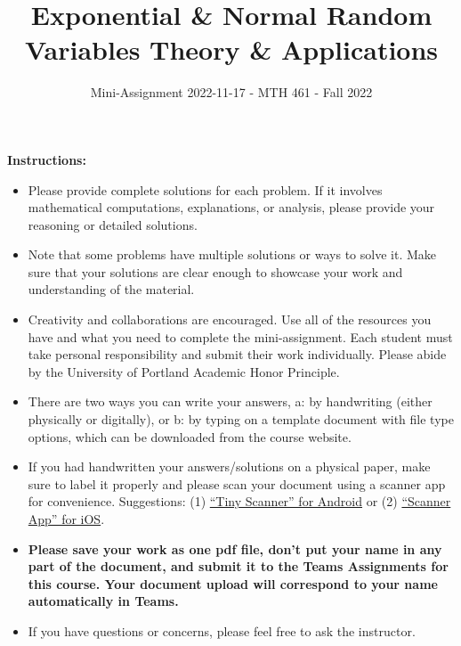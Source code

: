 \documentclass[
]{article}
\title{\textbf{Exponential \& Normal Random Variables Theory \& Applications}}
\subtitle{Mini-Assignment 2022-11-17 - MTH 461 - Fall 2022}
\author{}
\date{\vspace{-2.5em}}
\begin{document}
\maketitle

\hfill\break

\textbf{Instructions:}

\begin{itemize}
\item
  Please provide complete solutions for each problem. If it involves mathematical computations, explanations, or analysis, please provide your reasoning or detailed solutions.
\item
  Note that some problems have multiple solutions or ways to solve it. Make sure that your solutions are clear enough to showcase your work and understanding of the material.
\item
  Creativity and collaborations are encouraged. Use all of the resources you have and what you need to complete the mini-assignment. Each student must take personal responsibility and submit their work individually. Please abide by the University of Portland Academic Honor Principle.
\item
  There are two ways you can write your answers, a: by handwriting (either physically or digitally), or b: by typing on a template document with file type options, which can be downloaded from the course website.
\item
  If you had handwritten your answers/solutions on a physical paper, make sure to label it properly and please scan your document using a scanner app for convenience. Suggestions: (1) \href{https://play.google.com/store/apps/details?id=com.appxy.tinyscanner\&hl=en_US\&gl=US}{``Tiny Scanner'' for Android} or (2) \href{https://apps.apple.com/us/app/scanner-app-scan-pdf-document/id595563753}{``Scanner App'' for iOS}.
\item
  \textbf{Please save your work as one pdf file, don't put your name in any part of the document, and submit it to the Teams Assignments for this course. Your document upload will correspond to your name automatically in Teams.}
\item
  If you have questions or concerns, please feel free to ask the instructor.
\end{itemize}

\newpage
\end{document}
